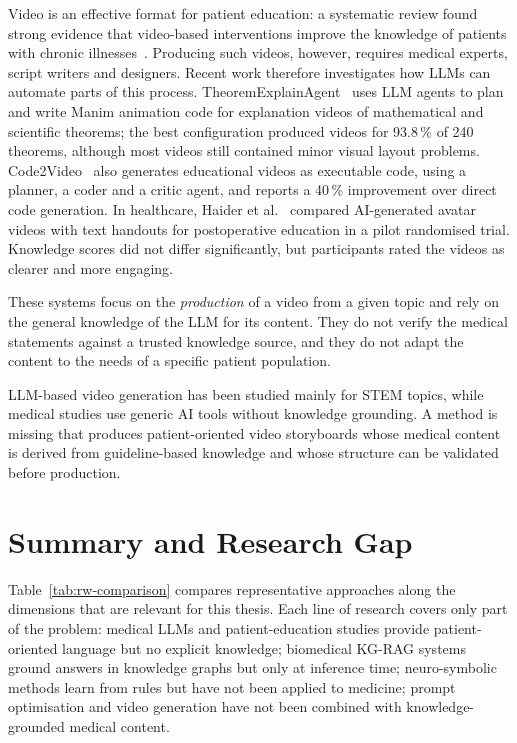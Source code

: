 Video is an effective format for patient education: a systematic review
found strong evidence that video-based interventions improve the knowledge
of patients with chronic illnesses~\cite{deshpande2023video}. Producing such
videos, however, requires medical experts, script writers and designers.
Recent work therefore investigates how LLMs can automate parts of this
process. TheoremExplainAgent~\cite{ku2025theoremexplainagent} uses LLM agents
to plan and write Manim animation code for explanation videos of
mathematical and scientific theorems; the best configuration produced
videos for 93.8\,\% of 240 theorems, although most videos still contained
minor visual layout problems. Code2Video~\cite{chen2026code2video} also
generates educational videos as executable code, using a planner, a coder and
a critic agent, and reports a 40\,\% improvement over direct code generation.
In healthcare, Haider et al.~\cite{haider2026ai} compared AI-generated avatar
videos with text handouts for postoperative education in a pilot randomised
trial. Knowledge scores did not differ significantly, but participants rated
the videos as clearer and more engaging.

These systems focus on the \emph{production} of a video from a given topic
and rely on the general knowledge of the LLM for its content. They do not
verify the medical statements against a trusted knowledge source, and they do
not adapt the content to the needs of a specific patient population.

\begin{rwgap}
LLM-based video generation has been studied mainly for STEM topics, while
medical studies use generic AI tools without knowledge grounding. A method is
missing that produces patient-oriented video storyboards whose medical
content is derived from guideline-based knowledge and whose structure can be
validated before production.
\end{rwgap}

\section{Summary and Research Gap}
\label{sec:rw-summary}

Table~\ref{tab:rw-comparison} compares representative approaches along the
dimensions that are relevant for this thesis. Each line of research covers
only part of the problem: medical LLMs and patient-education studies provide
patient-oriented language but no explicit knowledge; biomedical KG-RAG
systems ground answers in knowledge graphs but only at inference time;
neuro-symbolic methods learn from rules but have not been applied to
medicine; prompt optimisation and video generation have not been combined
with knowledge-grounded medical content.

